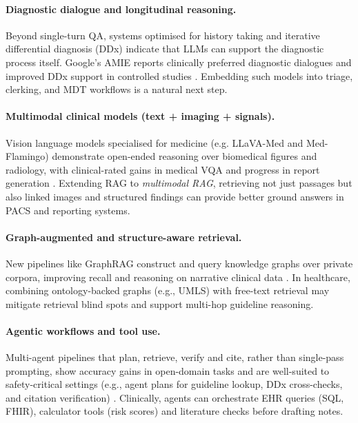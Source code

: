 \paragraph{Diagnostic dialogue and longitudinal reasoning.}
Beyond single-turn QA, systems optimised for history taking and iterative differential diagnosis (DDx) indicate that LLMs can support the diagnostic process itself. Google's AMIE reports clinically preferred diagnostic dialogues and improved DDx support in controlled studies \citep{tu2024amie,amie2024blog}. Embedding such models into triage, clerking, and MDT workflows is a natural next step.

\paragraph{Multimodal clinical models (text + imaging + signals).}
Vision language models specialised for medicine (e.g. LLaVA-Med and Med-Flamingo) demonstrate open-ended reasoning over biomedical figures and radiology, with clinical-rated gains in medical VQA and progress in report generation \citep{li2023llavamed,moor2023medflamingo,nature2024flamingocxr}. Extending RAG to \emph{multimodal RAG}, retrieving not just passages but also linked images and structured findings can provide better ground answers in PACS and reporting systems.

\paragraph{Graph-augmented and structure-aware retrieval.}
New pipelines like GraphRAG construct and query knowledge graphs over private corpora, improving recall and reasoning on narrative clinical data \citep{larson2024graphrag,graphrag2024arxiv}. In healthcare, combining ontology-backed graphs (e.g., UMLS) with free-text retrieval may mitigate retrieval blind spots and support multi-hop guideline reasoning.

\paragraph{Agentic workflows and tool use.}
Multi-agent pipelines that plan, retrieve, verify and cite, rather than single-pass prompting, show accuracy gains in open-domain tasks and are well-suited to safety-critical settings (e.g., agent plans for guideline lookup, DDx cross-checks, and citation verification) \citep{sun2025agenticrag}. Clinically, agents can orchestrate EHR queries (SQL, FHIR), calculator tools (risk scores) and literature checks before drafting notes.

